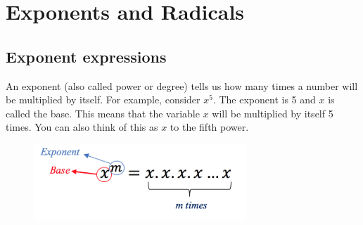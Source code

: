 \chapter{Exponents and Radicals}
\section{Exponent expressions}
An exponent (also called power or degree) tells us how many times a number will be 
multiplied by itself. For example, consider $x^5$. The exponent is 5 and $x$ is 
called the base. This means that the variable $x$ will be multiplied by itself 5 
times. You can also think of this as $x$ to the fifth power.
\begin{figure}[ht]
\begin{center}
	\includegraphics[width=8cm]{pics/exponent.png}
\end{center}
\end{figure}
\vspace{-1.3cm}

